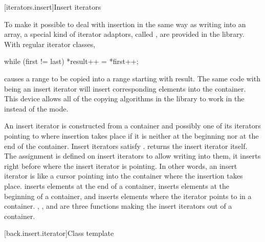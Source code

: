 [iterators.insert]{Insert iterators}

\pnum
To make it possible to deal with insertion in the same way as writing into an array, a special kind of iterator
adaptors, called
,
are provided in the library.
With regular iterator classes,

\begin{codeblock}
while (first != last) *result++ = *first++;
\end{codeblock}

causes a range 
to be copied into a range starting with result.
The same code with
being an insert iterator will insert corresponding elements into the container.
This device allows all of the
copying algorithms in the library to work in the
instead of the  mode.

\pnum
An insert iterator is constructed from a container and possibly one of its iterators pointing to where
insertion takes place if it is neither at the beginning nor at the end of the container.
Insert iterators satisfy .
returns the insert iterator itself.
The assignment
is defined on insert iterators to allow writing into them, it inserts
right before where the insert iterator is pointing.
In other words, an insert iterator is like a cursor pointing into the
container where the insertion takes place.
inserts elements at the end of a container,
inserts elements at the beginning of a container, and
inserts elements where the iterator points to in a container.
,
,
and
are three
functions making the insert iterators out of a container.

[back.insert.iterator]{Class template }

